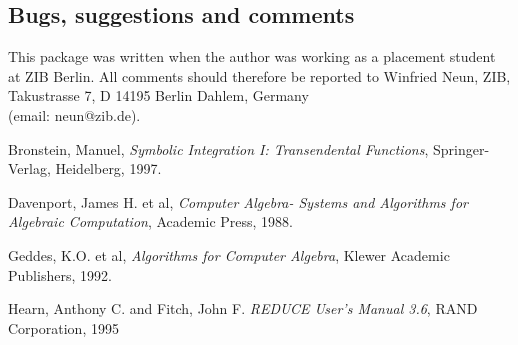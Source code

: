 \subsection{Bugs, suggestions and comments}
This package was written when the author was working as a placement student at ZIB Berlin. All comments should therefore be reported to Winfried Neun, ZIB, Takustrasse 7, D 14195 Berlin Dahlem, Germany \\ (email: neun@zib.de).


\begin{thebibliography}{999999} 
\normalsize
{} Bronstein, Manuel,
{\it Symbolic Integration I: Transendental Functions},
Springer-Verlag, Heidelberg, 1997.

 Davenport, James H. et al,
{\it Computer Algebra- Systems and Algorithms for Algebraic Computation},
Academic Press, 1988.

 Geddes, K.O. et al,
{\it Algorithms for Computer Algebra}, Klewer Academic \mbox{Publishers}, 1992.

 Hearn, Anthony C. and Fitch, John F.
{\it REDUCE User's Manual 3.6}, RAND Corporation, 1995
\end{thebibliography}





























































